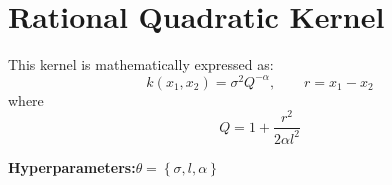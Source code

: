 \documentclass{article}
\begin{document}
\section{Rational Quadratic Kernel}
\label{sec:RQKernel}

This kernel is mathematically expressed as:
\begin{equation}
\label{eq:RQKernel}
	k\!\left(x_1,x_2\right) = \sigma^2 Q^{-\alpha}, \qquad r = x_1 - x_2
\end{equation}
where
\begin{equation}
\label{eq:RQKernel_Q}
Q = 1 + \frac{r^2}{2 \alpha l^2}
\end{equation}

\begin{center}
	\textbf{Hyperparameters:}\hspace{20pt}$\theta = \left\lbrace \sigma,l,\alpha \right\rbrace$
\end{center}

\begin{comment}
\begin{equation}
\label{eq:RQKernel_d1x}
	\begin{gathered}
	\frac{\partial k\!\left(x_1,x_2\right)}{\partial x_1} = - \frac{\partial r}{\partial x_1} \frac{\sigma^2 r}{l^2} \left(1 + \frac{r^2}{2 \alpha l^2}\right)^{-\alpha - 1} \\
	\frac{\partial k\!\left(x_1,x_2\right)}{\partial x_2} = - \frac{\partial r}{\partial x_2} \frac{\sigma^2 r}{l^2} \left(1 + \frac{r^2}{2 \alpha l^2}\right)^{-\alpha - 1}
	\end{gathered}
\end{equation}

\begin{equation}
\label{eq:RQKernel_d2x}
	\frac{\partial^2 k\!\left(x_1,x_2\right)}{\partial x_1 \partial x_2} = \frac{\partial r}{\partial x_1} \frac{\partial r}{\partial x_2} \frac{\sigma^2}{l^2} \left(\frac{r^2}{l^2} \frac{2\alpha + 1}{2\alpha} - 1\right) \left(1 + \frac{r^2}{2 \alpha l^2}\right)^{-\alpha - 2}
\end{equation}
\end{comment}
\end{document}
